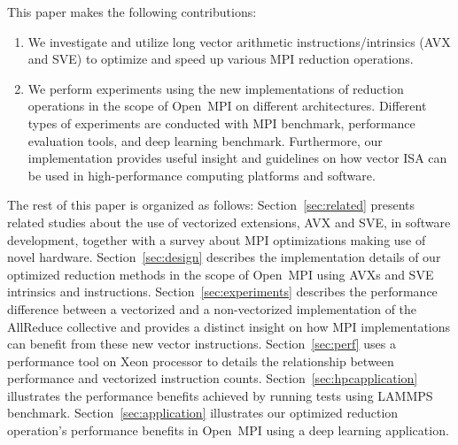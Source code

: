 \documentclass[5p,times,twocolumn]{elsarticle}
\newcommand{\ompi}[0]{Open~MPI\xspace}
\newcommand{\mpi}[0]{\textsc{MPI}\xspace}
\newcommand{\sve}[0]{\textsc{SVE}\xspace}
\newcommand{\allreduce}[0]{AllReduce\xspace}
\begin{document}
This paper makes the following contributions:
\begin{enumerate}
  \item We investigate and utilize long vector arithmetic instructions/intrinsics (AVX and SVE) to optimize and
  speed up various \mpi reduction operations.
%
  \item We perform experiments using the new implementations of reduction operations in the scope
  of \ompi on different architectures. Different types of
  experiments are conducted with \mpi benchmark, performance evaluation tools, and
  deep learning benchmark.
  Furthermore, our implementation provides useful insight and guidelines on how vector
  ISA can be used in high-performance computing platforms and software.
\end{enumerate}

The rest of this paper is organized as follows:
Section~\ref{sec:related} presents related studies about the use of vectorized extensions, AVX and \sve, in software development, together with a survey about \mpi optimizations making use of novel hardware.
Section~\ref{sec:design} describes the implementation details of our optimized reduction methods
in the scope of \ompi using AVXs and SVE intrinsics and instructions.
Section~\ref{sec:experiments} describes the performance difference between
a vectorized and a non-vectorized implementation of the \allreduce collective and provides a distinct insight on how MPI implementations can benefit from these new vector instructions.
Section~\ref{sec:perf} uses a performance tool on Xeon processor to details the relationship between performance and vectorized instruction counts.
Section~\ref{sec:hpcapplication} illustrates the performance benefits achieved by running tests using LAMMPS benchmark.
Section~\ref{sec:application} illustrates our optimized reduction operation's performance
benefits in \ompi using a deep learning application.
\end{document}
